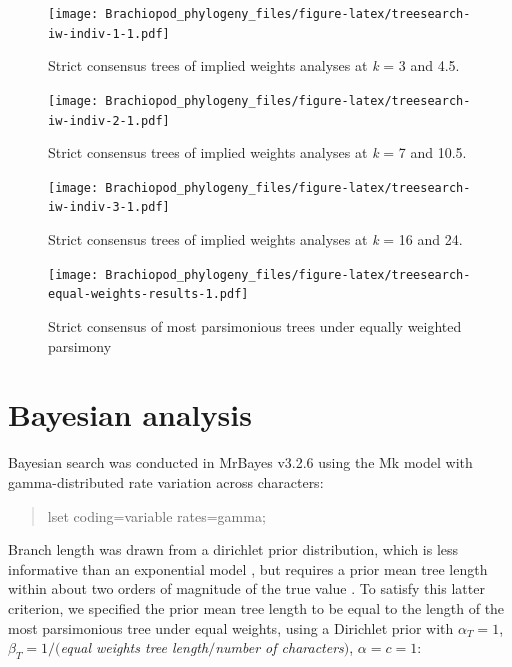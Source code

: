 \documentclass[openany]{book}
\begin{document}
\clearpage 

\begin{figure}
\centering
\texttt{[image: Brachiopod\_phylogeny\_files/figure-latex/treesearch-iw-indiv-1-1.pdf]}
\caption{\label{fig:treesearch-iw-indiv-1}Strict consensus trees of implied weights analyses
at \emph{k} = 3 and 4.5.}
\end{figure}

\clearpage 

\begin{figure}
\centering
\texttt{[image: Brachiopod\_phylogeny\_files/figure-latex/treesearch-iw-indiv-2-1.pdf]}
\caption{\label{fig:treesearch-iw-indiv-2}Strict consensus trees of implied weights analyses
at \emph{k} = 7 and 10.5.}
\end{figure}

\clearpage 

\begin{figure}
\centering
\texttt{[image: Brachiopod\_phylogeny\_files/figure-latex/treesearch-iw-indiv-3-1.pdf]}
\caption{\label{fig:treesearch-iw-indiv-3}Strict consensus trees of implied weights analyses
at \emph{k} = 16 and 24.}
\end{figure}

\clearpage

\begin{figure}
\centering
\texttt{[image: Brachiopod\_phylogeny\_files/figure-latex/treesearch-equal-weights-results-1.pdf]}
\caption{\label{fig:treesearch-equal-weights-results}Strict consensus of
most parsimonious trees under equally weighted parsimony}
\end{figure}

\clearpage

\hypertarget{bayesian}{\chapter{Bayesian analysis}\label{bayesian}}

Bayesian search was conducted in MrBayes v3.2.6 \citep{Ronquist2012}
using the Mk model \citep{Lewis2001} with gamma-distributed rate
variation across characters:

\begin{quote}
lset coding=variable rates=gamma;
\end{quote}

Branch length was drawn from a dirichlet prior distribution, which is
less informative than an exponential model \citep{Rannala2012}, but
requires a prior mean tree length within about two orders of magnitude
of the true value \citep{Zhang2012}. To satisfy this latter criterion,
we specified the prior mean tree length to be equal to the length of the
most parsimonious tree under equal weights, using a Dirichlet prior with
\(\alpha_T = 1\), \(\beta_T = 1/(\)\emph{equal weights tree
length}\(/\)\emph{number of characters}\()\), \(\alpha = c = 1\):
\end{document}
